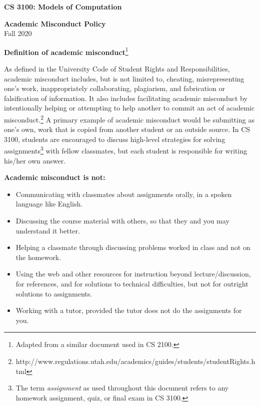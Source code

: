 \documentclass[11pt]{article}
\begin{document}
\begin{center}
\huge{{\bf CS 3100: Models of Computation}}
\vspace{0.25\baselineskip}

\large{{\bf Academic Misconduct Policy}\\
Fall 2020}
\end{center}
\vspace{1.1\baselineskip} 

{\bf \large Definition of academic
  misconduct}\footnote{Adapted from a similar document used in CS 2100.} 

As defined in the University Code of Student Rights and
Responsibilities, academic misconduct includes, but is not limited to,
cheating, misrepresenting one's work, inappropriately collaborating,
plagiarism, and fabrication or falsification of information. It also
includes facilitating academic misconduct by intentionally helping or
attempting to help another to commit an act of academic
misconduct.\footnote{http://www.regulations.utah.edu/academics/guides/students/studentRights.html}
A primary example of academic misconduct would be submitting as one's
own, work that is copied from another student or an outside source.
In CS 3100, students are encouraged to discuss high-level strategies
for solving assignments\footnote{The term {\em assignment} as used throughout this document refers to any homework assignment, quiz, or final exam in CS 3100.}
with fellow classmates, but each student is
responsible for writing his/her own answer.

{\bf Academic misconduct is not:}
\begin{itemize}
\vspace{-.15in}
\item Communicating with classmates about assignments orally, in a spoken language like English.
\item Discussing the course material with others, so that they and you may understand it better.
\item Helping a classmate through discussing problems worked in class and not on the homework. 
\item Using the web and other resources for instruction beyond lecture/discussion, for references, and for solutions to technical difficulties, but not for outright solutions to assignments.
\item Working with a tutor, provided the tutor does not do the assignments for you.
\end{itemize}
\end{document}
